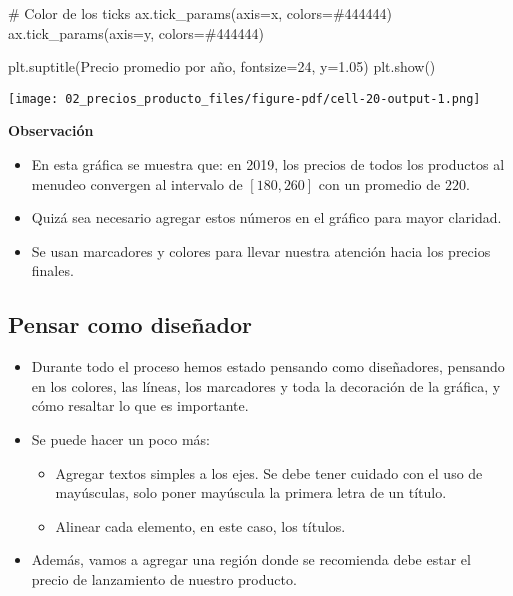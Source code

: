 \documentclass[
  letterpaper,
  DIV=11,
  numbers=noendperiod]{scrreprt}
\newenvironment{Shaded}{\begin{snugshade}}{\end{snugshade}}
\newcommand{\CommentTok}[1]{\textcolor[rgb]{0.37,0.37,0.37}{#1}}
\newcommand{\DecValTok}[1]{\textcolor[rgb]{0.68,0.00,0.00}{#1}}
\newcommand{\FloatTok}[1]{\textcolor[rgb]{0.68,0.00,0.00}{#1}}
\newcommand{\NormalTok}[1]{\textcolor[rgb]{0.00,0.23,0.31}{#1}}
\newcommand{\OperatorTok}[1]{\textcolor[rgb]{0.37,0.37,0.37}{#1}}
\newcommand{\StringTok}[1]{\textcolor[rgb]{0.13,0.47,0.30}{#1}}
\providecommand{\tightlist}{%
  \setlength{\itemsep}{0pt}\setlength{\parskip}{0pt}}\usepackage{longtable,booktabs,array}
\begin{document}
\begin{Shaded}
\begin{Highlighting}[]
\CommentTok{\# Color de los ticks}
\NormalTok{ax.tick\_params(axis}\OperatorTok{=}\StringTok{\textquotesingle{}x\textquotesingle{}}\NormalTok{, colors}\OperatorTok{=}\StringTok{\textquotesingle{}\#444444\textquotesingle{}}\NormalTok{)}
\NormalTok{ax.tick\_params(axis}\OperatorTok{=}\StringTok{\textquotesingle{}y\textquotesingle{}}\NormalTok{, colors}\OperatorTok{=}\StringTok{\textquotesingle{}\#444444\textquotesingle{}}\NormalTok{)}

\NormalTok{plt.suptitle(}\StringTok{\textquotesingle{}Precio promedio por año\textquotesingle{}}\NormalTok{, fontsize}\OperatorTok{=}\DecValTok{24}\NormalTok{, y}\OperatorTok{=}\FloatTok{1.05}\NormalTok{)}
\NormalTok{plt.show()}
\end{Highlighting}
\end{Shaded}

\texttt{[image: 02\_precios\_producto\_files/figure-pdf/cell-20-output-1.png]}

\textbf{Observación}

\begin{itemize}
\tightlist
\item
  En esta gráfica se muestra que: en 2019, los precios de todos los
  productos al menudeo convergen al intervalo de \([180, 260]\) con un
  promedio de \(220\).
\item
  Quizá sea necesario agregar estos números en el gráfico para mayor
  claridad.
\item
  Se usan marcadores y colores para llevar nuestra atención hacia los
  precios finales.
\end{itemize}

\subsection{Pensar como diseñador}\label{pensar-como-diseuxf1ador}

\begin{itemize}
\tightlist
\item
  Durante todo el proceso hemos estado pensando como diseñadores,
  pensando en los colores, las líneas, los marcadores y toda la
  decoración de la gráfica, y cómo resaltar lo que es importante.
\item
  Se puede hacer un poco más:

  \begin{itemize}
  \tightlist
  \item
    Agregar textos simples a los ejes. Se debe tener cuidado con el uso
    de mayúsculas, solo poner mayúscula la primera letra de un título.
  \item
    Alinear cada elemento, en este caso, los títulos.
  \end{itemize}
\item
  Además, vamos a agregar una región donde se recomienda debe estar el
  precio de lanzamiento de nuestro producto.
\end{itemize}
\end{document}
